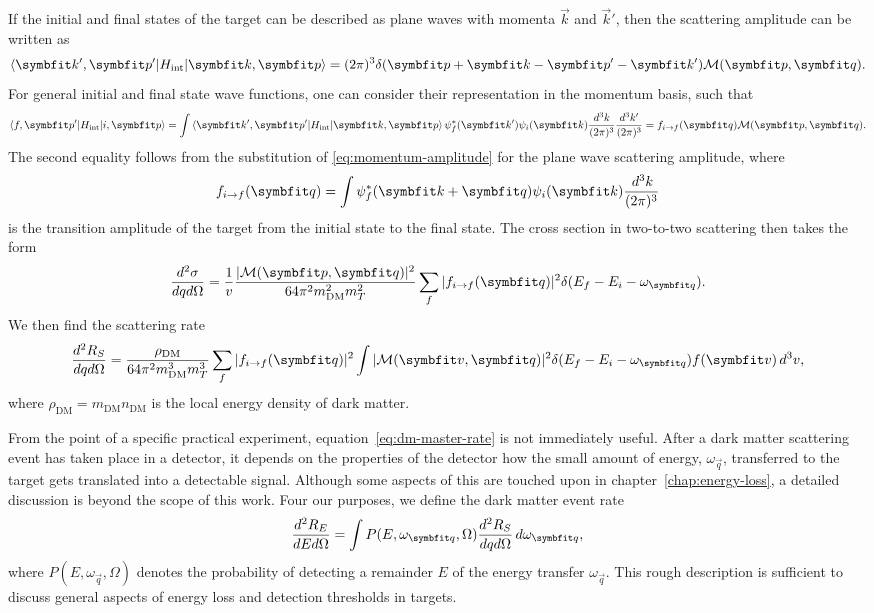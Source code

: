 If the initial and final states of the target can be described as plane waves with momenta $\vec{k}$ and $\vec{k}'$, then the scattering amplitude can be written as
\begin{equation}
    \brakett{\vec{k}',\vec{p}'}{H_\text{int}}{\vec{k},\vec{p}}=(2\pi)^3\delta(\vec{p}+\vec{k}-\vec{p}'-\vec{k}')\mathcal{M}(\vec{p},\vec{q}).
    \label{eq:momentum-amplitude}
\end{equation}
For general initial and final state wave functions, one can consider their representation in the momentum basis, such that
\begin{equation}
    \brakett{f,\vec{p}'}{H_\text{int}}{i,\vec{p}}=\int\brakett{\vec{k}',\vec{p}'}{H_\text{int}}{\Vec{k},\vec{p}}\psi_f^*(\vec{k}')\psi_i(\vec{k})\frac{d^3k}{(2\pi)^3}\frac{d^3k'}{(2\pi)^3}=f_{i\rightarrow f}(\vec{q})\mathcal{M}(\vec{p},\vec{q}).
\end{equation}
The second equality follows from the substitution of \eqref{eq:momentum-amplitude} for the plane wave scattering amplitude, where
\begin{equation}
    f_{i\rightarrow f}(\vec{q})=\int\psi_f^*(\vec{k}+\vec{q})\psi_i(\vec{k})\frac{\difd^3k}{(2\pi)^3}
\end{equation}
is the transition amplitude of the target from the initial state to the final state. The cross section in two-to-two scattering then takes the form
\begin{equation}
    \ddder{\sigma}{q}{\Omega}=\frac{1}{v}\frac{|\mathcal{M}(\vec{p},\vec{q})|^2}{64\pi^2m_\text{DM}^2m_T^2}\sum_f|f_{i\rightarrow f}(\vec{q})|^2\delta(E_f-E_i-\omega_{\vec{q}}).
\end{equation}
We then find the scattering rate
\begin{equation}
    \ddder{R_S}{q}{\Omega}=\frac{\rho_\text{DM}}{64\pi^2m_\text{DM}^3m_T^3}\sum_f|f_{i\rightarrow f}(\vec{q})|^2\int|\mathcal{M}(\vec{v},\vec{q})|^2\delta(E_f-E_i-\omega_{\vec{q}})f(\vec{v})\difd^3{v},
    \label{eq:dm-master-rate}
\end{equation}
where $\rho_\text{DM}=m_\text{DM}n_\text{DM}$ is the local energy density of dark matter.

From the point of a specific practical experiment, equation~\eqref{eq:dm-master-rate} is not immediately useful. After a dark matter scattering event has taken place in a detector, it depends on the properties of the detector how the small amount of energy, $\omega_{\vec{q}}$, transferred to the target gets translated into a detectable signal. Although some aspects of this are touched upon in chapter~\ref{chap:energy-loss}, a detailed discussion is beyond the scope of this work. Four our purposes, we define the dark matter event rate
\begin{equation}
    \ddder{R_E}{E}{\Omega}=\int P(E,\omega_{\vec{q}},\Omega)\ddder{R_S}{q}{\Omega}\difd\omega_{\vec{q}},
    \label{eq:dm-event-rate}
\end{equation}
where $P(E,\omega_{\vec{q}},\Omega)$ denotes the probability of detecting a remainder $E$ of the energy transfer $\omega_{\vec{q}}$. This rough description is sufficient to discuss general aspects of energy loss and detection thresholds in targets.

